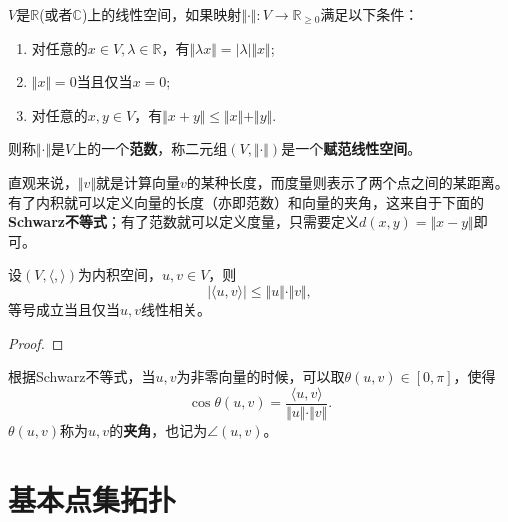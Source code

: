 \begin{definition}[范数]
    \(V\)是\(\mathbb{R}\)(或者\(\mathbb{C}\))上的线性空间，如果映射\(\Vert \cdot \Vert:V\to\mathbb{R}_{\geqslant0}\)满足以下条件：
    \begin{enumerate}
        \item 对任意的\(x\in V,\lambda\in\mathbb{R}\)，有\(\Vert\lambda x\Vert=\vert\lambda\vert\Vert x\Vert\);
        \item \(\Vert x\Vert=0\)当且仅当\(x=0\);
        \item 对任意的\(x,y\in V\)，有\(\Vert x+y\Vert\leq\Vert x\Vert+\Vert y\Vert\).
    \end{enumerate}
    则称\(\Vert\cdot\Vert\)是\(V\)上的一个\textbf{范数}，称二元组\((V,\Vert\cdot\Vert)\)是一个\textbf{赋范线性空间}。
\end{definition}
直观来说，\(\Vert v\Vert\)就是计算向量\(v\)的某种长度，而度量则表示了两个点之间的某距离。有了内积就可以定义向量的长度（亦即范数）和向量的夹角，这来自于下面的\textbf{Schwarz不等式}；有了范数就可以定义度量，只需要定义\(d(x,y)=\Vert x-y\Vert\)即可。
\begin{theorem}[Schwarz不等式]
    设\((V,\langle,\rangle)\)为内积空间，\(u,v\in V\)，则\[\vert\langle u,v\rangle\vert\leq\Vert u\Vert\cdot\Vert v\Vert,\]等号成立当且仅当\(u,v\)线性相关。
\end{theorem}

\begin{proof}
        
\end{proof}
根据Schwarz不等式，当\(u,v\)为非零向量的时候，可以取\(\theta(u,v)\in\left[0,\pi\right]\)，使得\[\cos\theta(u,v)=\frac{\langle u,v\rangle}{\Vert u\Vert\cdot\Vert v\Vert}.\]\(\theta(u,v)\)称为\(u,v\)的\textbf{夹角}，也记为\(\angle(u,v)\)。

\section{基本点集拓扑}

